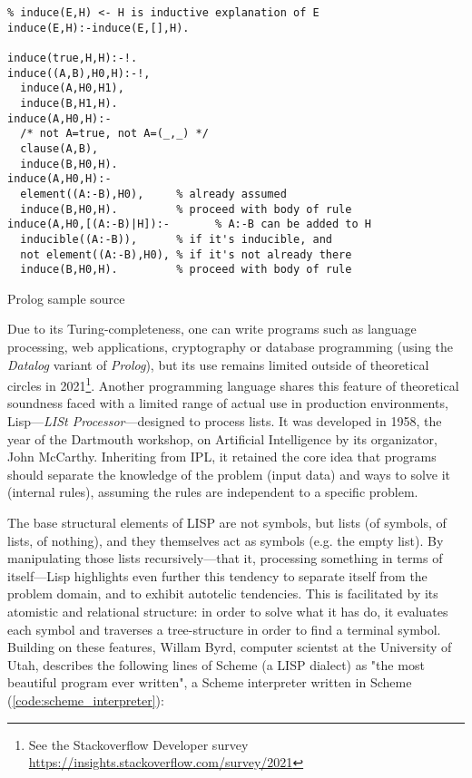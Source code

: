 \begin{listing}
  \begin{verbatim}
% induce(E,H) <- H is inductive explanation of E
induce(E,H):-induce(E,[],H).

induce(true,H,H):-!.
induce((A,B),H0,H):-!,
  induce(A,H0,H1),
  induce(B,H1,H).
induce(A,H0,H):-
  /* not A=true, not A=(_,_) */
  clause(A,B),
  induce(B,H0,H).
induce(A,H0,H):-
  element((A:-B),H0),     % already assumed
  induce(B,H0,H).         % proceed with body of rule
induce(A,H0,[(A:-B)|H]):-       % A:-B can be added to H
  inducible((A:-B)),      % if it's inducible, and
  not element((A:-B),H0), % if it's not already there
  induce(B,H0,H).         % proceed with body of rule
\end{verbatim}
  \caption{Prolog sample source}
  \label{code:prolog_sample}
\end{listing}

Due to its Turing-completeness, one can write programs such as language processing, web applications, cryptography or database programming (using the \emph{Datalog} variant of \emph{Prolog}), but its use remains limited outside of theoretical circles in 2021\footnote{See the Stackoverflow Developer survey \url{https://insights.stackoverflow.com/survey/2021}}. Another programming language shares this feature of theoretical soundness faced with a limited range of actual use in production environments, Lisp—\emph{LISt Processor}—designed to process lists. It was developed in 1958, the year of the Dartmouth workshop, on Artificial Intelligence by its organizator, John McCarthy. Inheriting from IPL, it retained the core idea that programs should separate the knowledge of the problem (input data) and ways to solve it (internal rules), assuming  the rules are independent to a specific problem.

The base structural elements of LISP are not symbols, but lists (of symbols, of lists, of nothing), and they themselves act as symbols (e.g. the empty list). By manipulating those lists recursively—that it, processing something in terms of itself—Lisp highlights  even further this tendency to separate itself from the problem domain, and to exhibit autotelic tendencies. This is facilitated by its atomistic and relational structure: in order to solve what it has do, it evaluates each symbol and traverses a tree-structure in order to find a terminal symbol. Building on these features, Willam Byrd, computer scientst at the University of Utah, describes the following lines of Scheme (a LISP dialect) as "the most beautiful program ever written"\cite{byrd_william_2017}, a Scheme interpreter written in Scheme (\ref{code:scheme_interpreter}):

